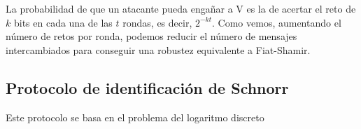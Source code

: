 La probabilidad de que un atacante pueda engañar a V es la de acertar el reto de $k$ bits en cada una de las $t$ rondas, es decir, $2^{-kt}$. Como vemos, aumentando el número de retos por ronda, podemos reducir el número de mensajes intercambiados para conseguir una robustez equivalente a Fiat-Shamir.





\subsection{Protocolo de identificación de Schnorr}



Este protocolo se basa en el problema del logaritmo discreto


